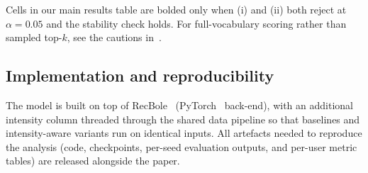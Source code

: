 Cells in our main results table are bolded only when (i) and (ii) both
reject at $\alpha{=}0.05$ and the stability check holds. For
full-vocabulary scoring rather than sampled top-$k$, see the cautions
in~\citep{krichene2020sampled}.

\subsection{Implementation and reproducibility}
\label{sec:setup:repro}

The model is built on top of RecBole~\citep{zhao2021recbole}
(PyTorch~\citep{paszke2019pytorch} back-end), with an
additional intensity column threaded through the shared data pipeline
so that baselines and intensity-aware variants run on identical inputs.
All artefacts needed to reproduce the analysis (code, checkpoints,
per-seed evaluation outputs, and per-user metric tables) are released
alongside the paper.
